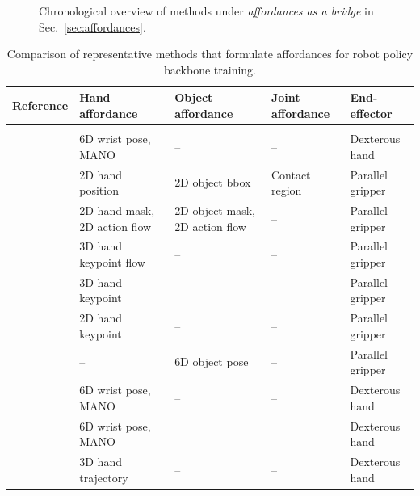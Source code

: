 \documentclass[Afour,sageh,times]{sagej}
\begin{document}
\begin{figure}[t]
{%
  }
  \caption{Chronological overview of methods under \textit{affordances as a bridge} in Sec.~\ref{sec:affordances}.}
  \label{fig:affordances_timeline}
\end{figure}


\begin{table}[t]
\centering
\scriptsize
\setlength{\tabcolsep}{3.2pt}
\caption{Comparison of representative methods that formulate affordances for robot policy backbone training.}
\label{tab:affordance_backbone}
\begin{tabularx}{\linewidth}{p{3.3cm}p{3.3cm} X X p{3.3cm}}
\toprule
Reference & Hand affordance & Object affordance & Joint affordance & End-effector \\
\midrule
\rowcolor{gray!15}
\multicolumn{5}{l}{\textit{Affordance-based pretraining}} \\
\cite{shaw2023videodex} & 6D wrist pose, MANO & -- & -- & Dexterous hand \\
\cite{srirama2024hrp} & 2D hand position & 2D object bbox & Contact region & Parallel gripper \\
\cite{chen2025visa} & 2D hand mask, 2D action flow & 2D object mask, 2D action flow & -- & Parallel gripper \\
\cite{spiridonov2025generalist} & 3D hand keypoint flow & -- & -- & Parallel gripper \\
\cite{yang2025ar} & 3D hand keypoint & -- & -- & Parallel gripper \\
\cite{jiang2025rynnvla} & 2D hand keypoint & -- & -- & Parallel gripper \\
\cite{yoshida2025developing} & -- & 6D object pose & -- & Parallel gripper \\
\cite{yang2025egovla} & 6D wrist pose, MANO & -- & -- & Dexterous hand \\
\cite{luo2025being} & 6D wrist pose, MANO & -- & -- & Dexterous hand \\
\cite{li2025scalable} & 3D hand trajectory & -- & -- & Dexterous hand \\

\end{tabularx}
\end{table}
\end{document}
